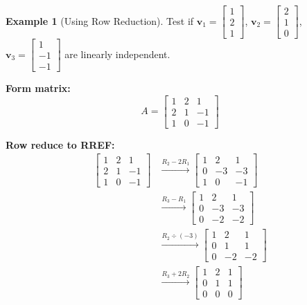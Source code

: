 \documentclass[12pt,a4paper]{article}
\theoremstyle{definition}
\newtheorem{example}{Example}[section]
\begin{document}
\begin{example}[Using Row Reduction]
Test if $\mathbf{v}_1 = \begin{bmatrix} 1 \\ 2 \\ 1 \end{bmatrix}$, $\mathbf{v}_2 = \begin{bmatrix} 2 \\ 1 \\ 0 \end{bmatrix}$, $\mathbf{v}_3 = \begin{bmatrix} 1 \\ -1 \\ -1 \end{bmatrix}$ are linearly independent.

\textbf{Form matrix:}
\begin{equation}
A = \begin{bmatrix} 1 & 2 & 1 \\ 2 & 1 & -1 \\ 1 & 0 & -1 \end{bmatrix}
\end{equation}

\textbf{Row reduce to RREF:}
\begin{align}
\begin{bmatrix} 1 & 2 & 1 \\ 2 & 1 & -1 \\ 1 & 0 & -1 \end{bmatrix} &\xrightarrow{R_2 - 2R_1} \begin{bmatrix} 1 & 2 & 1 \\ 0 & -3 & -3 \\ 1 & 0 & -1 \end{bmatrix} \\
&\xrightarrow{R_3 - R_1} \begin{bmatrix} 1 & 2 & 1 \\ 0 & -3 & -3 \\ 0 & -2 & -2 \end{bmatrix} \\
&\xrightarrow{R_2 \div (-3)} \begin{bmatrix} 1 & 2 & 1 \\ 0 & 1 & 1 \\ 0 & -2 & -2 \end{bmatrix} \\
&\xrightarrow{R_3 + 2R_2} \begin{bmatrix} 1 & 2 & 1 \\ 0 & 1 & 1 \\ 0 & 0 & 0 \end{bmatrix}
\end{align}


\end{example}
\end{document}
